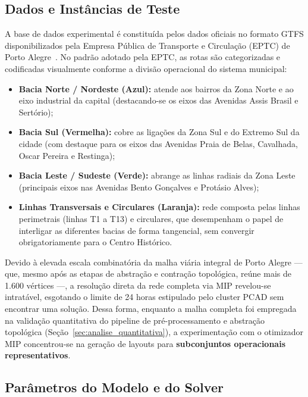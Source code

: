 \documentclass[cic,tc]{infufrgs}
\begin{document}
\subsection{Dados e Instâncias de Teste}
\label{subsec:dados_instancias}

A base de dados experimental é constituída pelos dados oficiais no formato GTFS disponibilizados pela Empresa Pública de Transporte e Circulação (EPTC) de Porto Alegre~\cite{EPTCGTFS}. No padrão adotado pela EPTC, as rotas são categorizadas e codificadas visualmente conforme a divisão operacional do sistema municipal:
\begin{itemize}
    \item \textbf{Bacia Norte / Nordeste (Azul):} atende aos bairros da Zona Norte e ao eixo industrial da capital (destacando-se os eixos das Avenidas Assis Brasil e Sertório);
    \item \textbf{Bacia Sul (Vermelha):} cobre as ligações da Zona Sul e do Extremo Sul da cidade (com destaque para os eixos das Avenidas Praia de Belas, Cavalhada, Oscar Pereira e Restinga);
    \item \textbf{Bacia Leste / Sudeste (Verde):} abrange as linhas radiais da Zona Leste (principais eixos nas Avenidas Bento Gonçalves e Protásio Alves);
    \item \textbf{Linhas Transversais e Circulares (Laranja):} rede composta pelas linhas perimetrais (linhas T1 a T13) e circulares, que desempenham o papel de interligar as diferentes bacias de forma tangencial, sem convergir obrigatoriamente para o Centro Histórico.
\end{itemize}

Devido à elevada escala combinatória da malha viária integral de Porto Alegre — que, mesmo após as etapas de abstração e contração topológica, reúne mais de 1.600 vértices —, a resolução direta da rede completa via MIP revelou-se intratável, esgotando o limite de 24 horas estipulado pelo cluster PCAD sem encontrar uma solução. Dessa forma, enquanto a malha completa foi empregada na validação quantitativa do pipeline de pré-processamento e abstração topológica (Seção~\ref{sec:analise_quantitativa}), a experimentação com o otimizador MIP concentrou-se na geração de layouts para \textbf{subconjuntos operacionais representativos}.

\subsection{Parâmetros do Modelo e do Solver}
\label{subsec:parametros_solver}
\end{document}
